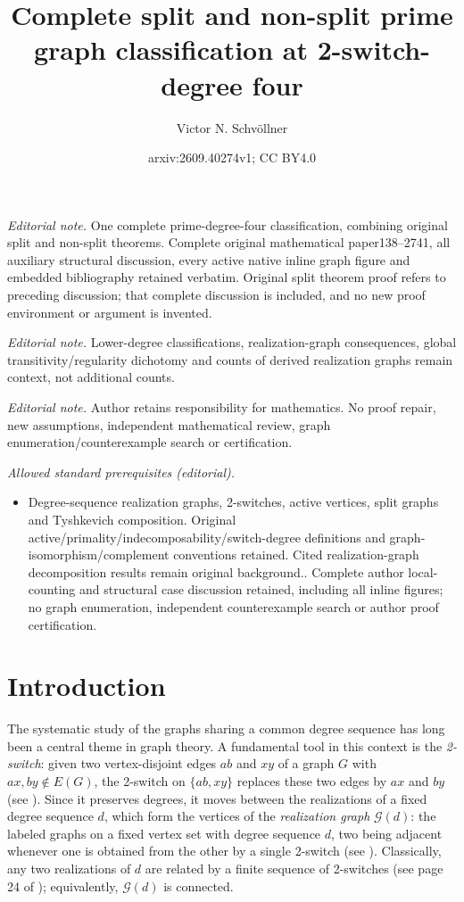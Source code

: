 \documentclass[11pt]{article}
\title{Complete split and non-split prime graph classification at 2-switch-degree four}
\author{Victor N. Schvöllner}
\date{arxiv:2609.40274v1; CC BY4.0}
\begin{document}
\maketitle
\noindent\textit{Editorial note.} One complete prime-degree-four classification, combining original split and non-split theorems. Complete original mathematical paper138--2741, all auxiliary structural discussion, every active native inline graph figure and embedded bibliography retained verbatim. Original split theorem proof refers to preceding discussion; that complete discussion is included, and no new proof environment or argument is invented.\par\medskip
\noindent\textit{Editorial note.} Lower-degree classifications, realization-graph consequences, global transitivity/regularity dichotomy and counts of derived realization graphs remain context, not additional counts.\par\medskip
\noindent\textit{Editorial note.} Author retains responsibility for mathematics. No proof repair, new assumptions, independent mathematical review, graph enumeration/counterexample search or certification.\par\medskip
\noindent\textit{Allowed standard prerequisites (editorial).}\begin{itemize}
\item Degree-sequence realization graphs, 2-switches, active vertices, split graphs and Tyshkevich composition. Original active/primality/indecomposability/switch-degree definitions and graph-isomorphism/complement conventions retained. Cited realization-graph decomposition results remain original background.. Complete author local-counting and structural case discussion retained, including all inline figures; no graph enumeration, independent counterexample search or author proof certification.
\end{itemize}\medskip
\section{Introduction}

 

The systematic study of the graphs sharing a common degree sequence has
long been a central theme in graph theory. A fundamental tool in this
context is the \emph{2-switch}: given two vertex-disjoint edges $ab$ and
$xy$ of a graph $G$ with $ax,by\notin E(G)$, the 2-switch on
$\{ab,xy\}$ replaces these two edges by $ax$ and $by$
(see \cite{chartrand2010graphs}). 
Since it preserves degrees, it moves between the
realizations of a fixed degree sequence $d$, which form the vertices of
the \emph{realization graph} $\mathcal{G}(d)$: the labeled graphs on a
fixed vertex set with degree sequence $d$, two being adjacent whenever
one is obtained from the other by a single 2-switch
(see \cite{arikati1999realization}). Classically, any two realizations of
$d$ are related by a finite sequence of 2-switches (see page 24 of
\cite{chartrand2010graphs}); equivalently, $\mathcal{G}(d)$ is connected.
\end{document}
